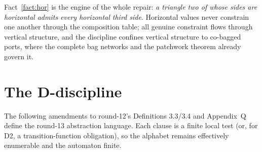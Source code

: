 \documentclass[11pt]{article}
\theoremstyle{definition}
\begin{document}
Fact~\ref{fact:hor} is the engine of the whole repair: \emph{a triangle
two of whose sides are horizontal admits every horizontal third side}.
Horizontal values never constrain one another through the composition
table; all genuine constraint flows through vertical structure, and the
discipline confines vertical structure to co-bagged ports, where the
complete bag networks and the patchwork theorem already govern it.

\section{The D-discipline}\label{sec:discipline}

The following amendments to round-12's Definitions 3.3/3.4 and Appendix~Q
define the round-13 abstraction language.  Each clause is a finite local
test (or, for D2, a transition-function obligation), so the alphabet
remains effectively enumerable and the automaton finite.
\end{document}
